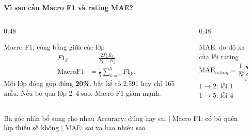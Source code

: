 \documentclass[aspectratio=169]{beamer}
\begin{document}
\begin{frame}{\textbf{\large Vì sao cần Macro F1 và rating MAE?}}
    \begin{columns}[T,onlytextwidth]
        \begin{column}{0.48\textwidth}
            \begin{block}{Macro F1: công bằng giữa các lớp}
                \begin{align*}
                    F1_k
                    &=\frac{2P_kR_k}{P_k+R_k},\\
                    \mathrm{MacroF1}
                    &=\frac{1}{5}\sum_{k=1}^{5}F1_k.
                \end{align*}
                Mỗi lớp đóng góp đúng \textbf{20\%}, bất kể có 2.591 hay chỉ
                165 mẫu. Nếu bỏ qua lớp 2--4 sao, Macro F1 giảm mạnh.
            \end{block}
        \end{column}

        \begin{column}{0.48\textwidth}
            \begin{block}{MAE: đo độ xa của lỗi rating}
                \[
                    \mathrm{MAE}_{rating}
                    =\frac{1}{N}\sum_{i=1}^{N}|y_i-\hat y_i|.
                \]
                \centering
                $1\!\rightarrow\!2$: lỗi 1
                \qquad
                $1\!\rightarrow\!5$: lỗi 4
            \end{block}
        \end{column}
    \end{columns}

    \vspace{0.25cm}
    \begin{exampleblock}{Ba góc nhìn bổ sung cho nhau}
        \centering
        Accuracy: đúng hay sai
        \quad $\big|$ \quad
        Macro F1: có bỏ quên lớp thiểu số không
        \quad $\big|$ \quad
        MAE: sai xa bao nhiêu sao
    \end{exampleblock}
\end{frame}
\end{document}
